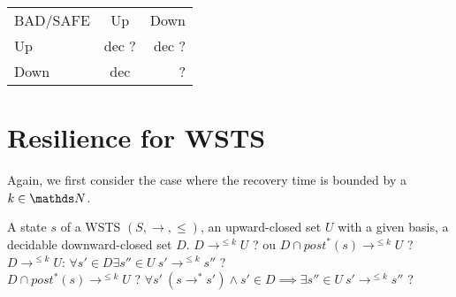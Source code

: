 \begin{tabular}{ l c r }
   BAD/SAFE & Up & Down \\
   Up & dec ? & dec ? \\
   Down & dec & ? \\
 \end{tabular}




\section{Resilience for WSTS}


%
%

Again, we first consider the case where the recovery time is bounded by a $k \in \N$.

{A state $s$ of a WSTS $(S,\rightarrow, \leq)$, an upward-closed set $U$ with a given basis, a decidable downward-closed set $D$.}
{$D \longrightarrow^{\leq k} U$ ?  ou $D \cap post^*(s) \longrightarrow^{\leq k} U$ ?  \newline}
%
%
$D \longrightarrow^{\leq k} U$: $\forall s' \in D \exists s'' \in U ~ s' \rightarrow^{\leq k} s''$ ?\\
%
$D \cap post^*(s) \longrightarrow^{\leq k} U$ ?
%
$\forall s' ~ (s \rightarrow^* s') \wedge s' \in D  \implies \exists s'' \in U ~ s' \rightarrow^{\leq k} s''$ ?


